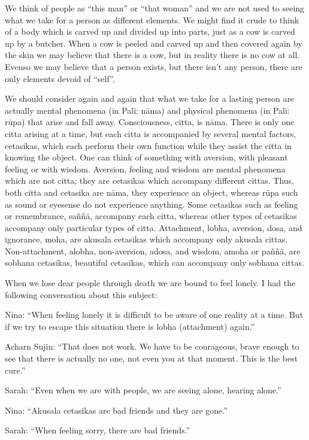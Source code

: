 We think of people as ``this man'' or ``that woman'' and we are not used
to seeing what we take for a person as different elements. We might find
it crude to think of a body which is carved up and divided up into
parts, just as a cow is carved up by a butcher. When a cow is peeled and
carved up and then covered again by the skin we may believe that there
is a cow, but in reality there is no cow at all. Evenso we may believe
that a person exists, but there isn't any person, there are only
elements devoid of ``self''.

We should consider again and again that what we take for a lasting
person are actually mental phenomena (in Pali: nāma) and physical
phenomena (in Pali: rūpa) that arise and fall away. Consciousness,
citta, is nāma. There is only one citta arising at a time, but each
citta is accompanied by several mental factors, cetasikas, which each
perform their own function while they assist the citta in knowing the
object. One can think of something with aversion, with pleasant feeling
or with wisdom. Aversion, feeling and wisdom are mental phenomena which
are not citta; they are cetasikas which accompany different cittas.
Thus, both citta and cetasika are nāma, they experience an object,
whereas rūpa such as sound or eyesense do not experience anything. Some
cetasikas such as feeling or remembrance, saññā, accompany each citta,
whereas other types of cetasikas accompany only particular types of
citta. Attachment, lobha, aversion, dosa, and ignorance, moha, are
akusala cetasikas which accompany only akusala cittas. Non-attachment,
alobha, non-aversion, adosa, and wisdom, amoha or paññā, are sobhana
cetasikas, beautiful cetasikas, which can accompany only sobhana cittas.

When we lose dear people through death we are bound to feel lonely. I
had the following conversation about this subject:

Nina: ``When feeling lonely it is difficult to be aware of one reality
at a time. But if we try to escape this situation there is lobha
(attachment) again.''

Acharn Sujin: ``That does not work. We have to be courageous, brave
enough to see that there is actually no one, not even you at that
moment. This is the best cure.''

Sarah: ``Even when we are with people, we are seeing alone, hearing
alone.''

Nina: ``Akusala cetasikas are bad friends and they are gone.''

Sarah: ``When feeling sorry, there are bad friends.''

